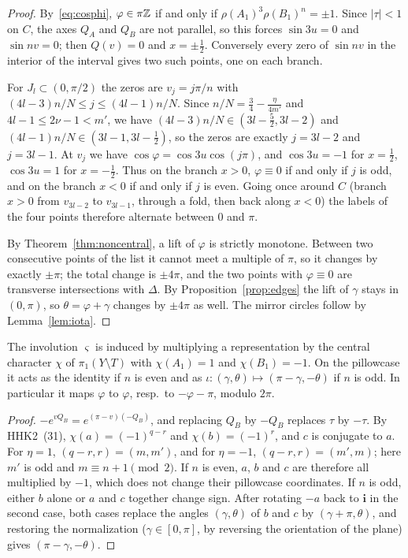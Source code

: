 \begin{proof}
By~\eqref{eq:cosphi}, $\varphi\in\pi\mathbb{Z}$ if and only if $\rho(A_1)^3\rho(B_1)^n=\pm1$. Since $|\tau|<1$ on $C$, the axes $Q_A$ and
$Q_B$ are not parallel, so this forces $\sin3u=0$ and $\sin nv=0$; then $Q(v)=0$ and $x=\pm\frac12$. Conversely every
zero of $\sin nv$ in the interior of the interval gives two such points, one on each branch.

For $J_l\subset(0,\pi/2)$ the zeros are $v_j=j\pi/n$ with $(4l-3)n/N\le j\le(4l-1)n/N$. Since $n/N=\frac34-\frac{\eta}{4m'}$ and
$4l-1\le2\nu-1<m'$, we have $(4l-3)n/N\in(3l-\frac52,3l-2)$ and $(4l-1)n/N\in(3l-1,3l-\frac12)$, so the zeros are exactly
$j=3l-2$ and $j=3l-1$. At $v_j$ we have $\cos\varphi=\cos3u\cos(j\pi)$, and
$\cos3u=-1$ for $x=\frac12$, $\cos3u=1$ for $x=-\frac12$. Thus on the branch $x>0$, $\varphi\equiv0$ if and only if $j$ is odd, and on
the branch $x<0$ if and only if $j$ is even. Going once around $C$ (branch $x>0$ from $v_{3l-2}$ to $v_{3l-1}$, through a
fold, then back along $x<0$) the labels of the four points therefore alternate between $0$ and $\pi$.

By Theorem~\ref{thm:noncentral}, a lift of $\varphi$ is strictly monotone. Between two consecutive points of the list it
cannot meet a multiple of $\pi$, so it changes by exactly $\pm\pi$; the total change is $\pm4\pi$, and the two points with
$\varphi\equiv0$ are transverse intersections with $\Delta$. By Proposition~\ref{prop:edges} the lift of $\gamma$ stays in
$(0,\pi)$, so $\theta=\varphi+\gamma$ changes by $\pm4\pi$ as well. The mirror circles follow by Lemma~\ref{lem:iota}.
\end{proof}

\begin{lemma}\label{lem:iota}
The involution $\varsigma$ is induced by multiplying a representation by the central character $\chi$ of
$\pi_1(Y\setminus T)$ with $\chi(A_1)=1$ and $\chi(B_1)=-1$. On the pillowcase it acts as the identity if $n$ is even and
as $\iota\colon(\gamma,\theta)\mapsto(\pi-\gamma,-\theta)$ if $n$ is odd. In particular it maps $\varphi$ to $\varphi$, resp.\ to $-\varphi-\pi$, modulo
$2\pi$.
\end{lemma}

\begin{proof}
$-e^{vQ_B}=e^{(\pi-v)(-Q_B)}$, and replacing $Q_B$ by $-Q_B$ replaces $\tau$ by $-\tau$. By HHK2~(31),
$\chi(a)=(-1)^{q-r}$ and $\chi(b)=(-1)^{r}$, and $c$ is conjugate to $a$. For $\eta=1$, $(q-r,r)=(m,m')$, and for $\eta=-1$,
$(q-r,r)=(m',m)$; here $m'$ is odd and $m\equiv n+1\pmod2$. If $n$ is even, $a$, $b$ and $c$ are therefore all multiplied by $-1$,
which does not change their pillowcase coordinates. If $n$ is odd, either $b$ alone or $a$ and $c$ together change
sign. After rotating $-a$ back to $\mathbf i$ in the second case, both cases replace the angles $(\gamma,\theta)$ of $b$ and $c$ by
$(\gamma+\pi,\theta)$, and restoring the normalization ($\gamma\in[0,\pi]$, by reversing the orientation of the plane) gives
$(\pi-\gamma,-\theta)$.
\end{proof}


